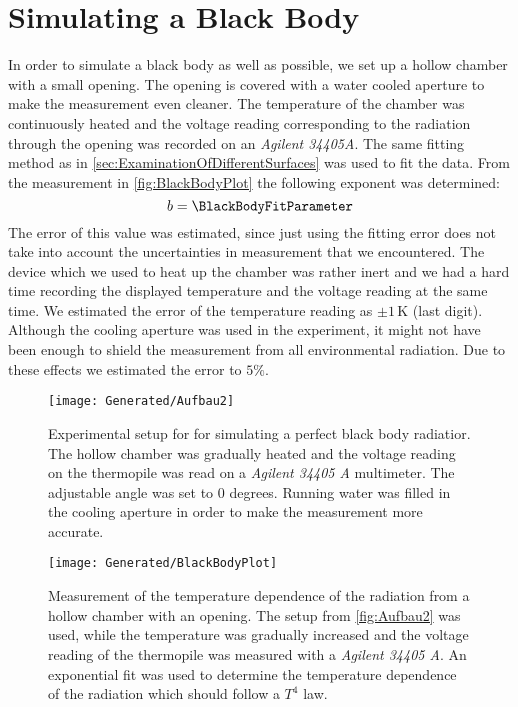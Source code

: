 \documentclass[a4paper,10pt,twocolumn]{article}
\begin{document}
    \section{Simulating a Black Body}\label{sec:BlackBodyRadiation}
    In order to simulate a black body as well as possible, we set up a hollow chamber with a small opening.
    The opening is covered with a water cooled aperture to make the measurement even cleaner.
    The temperature of the chamber was continuously heated and the voltage reading corresponding to the radiation through the opening was recorded on an \textit{Agilent 34405A}.
    The same fitting method as in \autoref{sec:ExaminationOfDifferentSurfaces} was used to fit the data.
    From the measurement in \autoref{fig:BlackBodyPlot} the following exponent was determined:
    \begin{equation}
        b = \BlackBodyFitParameter
    \end{equation}
    The error of this value was estimated, since just using the fitting error does not take into account the uncertainties in measurement that we encountered.
    The device which we used to heat up the chamber was rather inert and we had a hard time recording the displayed temperature and the voltage reading at the same time.
    We estimated the error of the temperature reading as $\pm 1\,$K (last digit).
    Although the cooling aperture was used in the experiment, it might not have been enough to shield the measurement from all environmental radiation.
    Due to these effects we estimated the error to $5\%$\).
    \begin{figure}
        \begin{center}
            \texttt{[image: Generated/Aufbau2]}
            \caption{Experimental setup for for simulating a perfect black body radiatior. The hollow chamber was gradually heated 
            and the voltage reading on the thermopile was read on a \textit{Agilent 34405 A} multimeter. The adjustable angle was set to 0 degrees.
            Running water was filled in the cooling aperture in order to make the measurement more accurate.}
            \label{fig:Aufbau2}
        \end{center}
    \end{figure}
    \begin{figure}
        \begin{center}
            \texttt{[image: Generated/BlackBodyPlot]}
            \caption{Measurement of the temperature dependence of the radiation from a hollow chamber with an opening.
            The setup from \autoref{fig:Aufbau2} was used, while the temperature was gradually increased and the voltage reading of the thermopile
            was measured with a \textit{Agilent 34405 A}.
            An exponential fit was used to determine the temperature dependence of the radiation which should follow a $T^4$ law.}
            \label{fig:BlackBodyPlot}
        \end{center}
    \end{figure}
\end{document}
